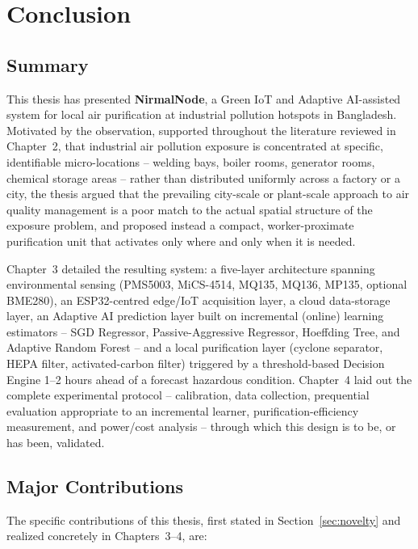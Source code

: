 \chapter{Conclusion}
\label{ch:conclusion}

\section{Summary}
\label{sec:conc-summary}

This thesis has presented \textbf{NirmalNode}, a Green IoT and Adaptive AI-assisted system for local air purification at industrial pollution hotspots in Bangladesh. Motivated by the observation, supported throughout the literature reviewed in Chapter~2, that industrial air pollution exposure is concentrated at specific, identifiable micro-locations -- welding bays, boiler rooms, generator rooms, chemical storage areas -- rather than distributed uniformly across a factory or a city, the thesis argued that the prevailing city-scale or plant-scale approach to air quality management is a poor match to the actual spatial structure of the exposure problem, and proposed instead a compact, worker-proximate purification unit that activates only where and only when it is needed.

Chapter~3 detailed the resulting system: a five-layer architecture spanning environmental sensing (PMS5003, MiCS-4514, MQ135, MQ136, MP135, optional BME280), an ESP32-centred edge/IoT acquisition layer, a cloud data-storage layer, an Adaptive AI prediction layer built on incremental (online) learning estimators -- SGD Regressor, Passive-Aggressive Regressor, Hoeffding Tree, and Adaptive Random Forest -- and a local purification layer (cyclone separator, HEPA filter, activated-carbon filter) triggered by a threshold-based Decision Engine 1--2 hours ahead of a forecast hazardous condition. Chapter~4 laid out the complete experimental protocol -- calibration, data collection, prequential evaluation appropriate to an incremental learner, purification-efficiency measurement, and power/cost analysis -- through which this design is to be, or has been, validated.

\section{Major Contributions}
\label{sec:conc-contributions}

The specific contributions of this thesis, first stated in Section~\ref{sec:novelty} and realized concretely in Chapters~3--4, are:

